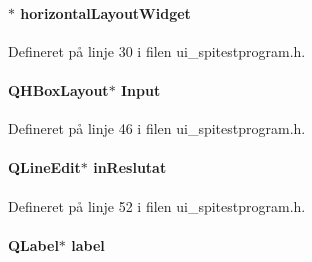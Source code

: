 \paragraph[{\texorpdfstring{horizontal\+Layout\+Widget}{horizontalLayoutWidget}}]{$\ast$ horizontal\+Layout\+Widget}\hypertarget{class_ui___spi_test_program_a8d9662f61dc85ce78495602f1d03006f}{}\label{class_ui___spi_test_program_a8d9662f61dc85ce78495602f1d03006f}


Defineret på linje 30 i filen ui\+\_\+spitestprogram.\+h.

\paragraph[{\texorpdfstring{Input}{Input}}]{\setlength{\rightskip}{0pt plus 5cm}Q\+H\+Box\+Layout$\ast$ Input}\hypertarget{class_ui___spi_test_program_a69c0d851a1ffb0301d02c43531ba2f6d}{}\label{class_ui___spi_test_program_a69c0d851a1ffb0301d02c43531ba2f6d}


Defineret på linje 46 i filen ui\+\_\+spitestprogram.\+h.

\paragraph[{\texorpdfstring{in\+Reslutat}{inReslutat}}]{\setlength{\rightskip}{0pt plus 5cm}Q\+Line\+Edit$\ast$ in\+Reslutat}\hypertarget{class_ui___spi_test_program_a14fdf98633693052d40f7b3dfaa64149}{}\label{class_ui___spi_test_program_a14fdf98633693052d40f7b3dfaa64149}


Defineret på linje 52 i filen ui\+\_\+spitestprogram.\+h.

\paragraph[{\texorpdfstring{label}{label}}]{\setlength{\rightskip}{0pt plus 5cm}Q\+Label$\ast$ label}\hypertarget{class_ui___spi_test_program_a22925632964060df176ccbc0de5fa511}{}\label{class_ui___spi_test_program_a22925632964060df176ccbc0de5fa511}


